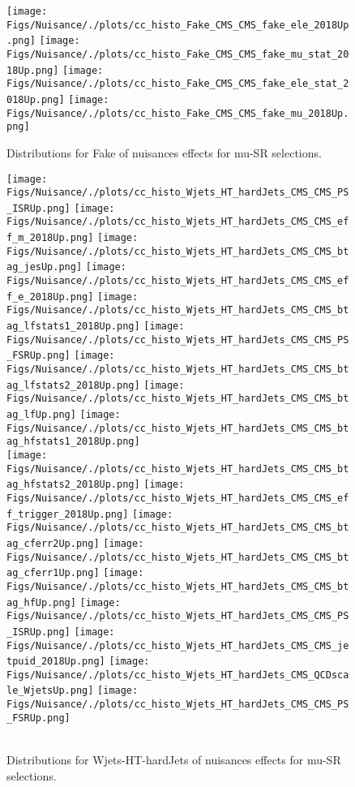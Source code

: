 \begin{figure*}[htbp]  
\centering 
\texttt{[image: Figs/Nuisance/./plots/cc\_histo\_Fake\_CMS\_CMS\_fake\_ele\_2018Up.png]}
\texttt{[image: Figs/Nuisance/./plots/cc\_histo\_Fake\_CMS\_CMS\_fake\_mu\_stat\_2018Up.png]}
\texttt{[image: Figs/Nuisance/./plots/cc\_histo\_Fake\_CMS\_CMS\_fake\_ele\_stat\_2018Up.png]}
\texttt{[image: Figs/Nuisance/./plots/cc\_histo\_Fake\_CMS\_CMS\_fake\_mu\_2018Up.png]}
\\ 
\caption{ 
   Distributions for Fake of nuisances effects for mu-SR selections.
} 
\label{fig:Fake_mu_SR} 
\end{figure*} 




\begin{figure*}[htbp]  
\centering 
\texttt{[image: Figs/Nuisance/./plots/cc\_histo\_Wjets\_HT\_hardJets\_CMS\_CMS\_PS\_ISRUp.png]}
\texttt{[image: Figs/Nuisance/./plots/cc\_histo\_Wjets\_HT\_hardJets\_CMS\_CMS\_eff\_m\_2018Up.png]}
\texttt{[image: Figs/Nuisance/./plots/cc\_histo\_Wjets\_HT\_hardJets\_CMS\_CMS\_btag\_jesUp.png]}
\texttt{[image: Figs/Nuisance/./plots/cc\_histo\_Wjets\_HT\_hardJets\_CMS\_CMS\_eff\_e\_2018Up.png]}
\texttt{[image: Figs/Nuisance/./plots/cc\_histo\_Wjets\_HT\_hardJets\_CMS\_CMS\_btag\_lfstats1\_2018Up.png]}
\texttt{[image: Figs/Nuisance/./plots/cc\_histo\_Wjets\_HT\_hardJets\_CMS\_CMS\_PS\_FSRUp.png]}
\texttt{[image: Figs/Nuisance/./plots/cc\_histo\_Wjets\_HT\_hardJets\_CMS\_CMS\_btag\_lfstats2\_2018Up.png]}
\texttt{[image: Figs/Nuisance/./plots/cc\_histo\_Wjets\_HT\_hardJets\_CMS\_CMS\_btag\_lfUp.png]}
\texttt{[image: Figs/Nuisance/./plots/cc\_histo\_Wjets\_HT\_hardJets\_CMS\_CMS\_btag\_hfstats1\_2018Up.png]}\\
\texttt{[image: Figs/Nuisance/./plots/cc\_histo\_Wjets\_HT\_hardJets\_CMS\_CMS\_btag\_hfstats2\_2018Up.png]}
\texttt{[image: Figs/Nuisance/./plots/cc\_histo\_Wjets\_HT\_hardJets\_CMS\_CMS\_eff\_trigger\_2018Up.png]}
\texttt{[image: Figs/Nuisance/./plots/cc\_histo\_Wjets\_HT\_hardJets\_CMS\_CMS\_btag\_cferr2Up.png]}
\texttt{[image: Figs/Nuisance/./plots/cc\_histo\_Wjets\_HT\_hardJets\_CMS\_CMS\_btag\_cferr1Up.png]}
\texttt{[image: Figs/Nuisance/./plots/cc\_histo\_Wjets\_HT\_hardJets\_CMS\_CMS\_btag\_hfUp.png]}
\texttt{[image: Figs/Nuisance/./plots/cc\_histo\_Wjets\_HT\_hardJets\_CMS\_CMS\_PS\_ISRUp.png]}
\texttt{[image: Figs/Nuisance/./plots/cc\_histo\_Wjets\_HT\_hardJets\_CMS\_CMS\_jetpuid\_2018Up.png]}
\texttt{[image: Figs/Nuisance/./plots/cc\_histo\_Wjets\_HT\_hardJets\_CMS\_QCDscale\_WjetsUp.png]}
\texttt{[image: Figs/Nuisance/./plots/cc\_histo\_Wjets\_HT\_hardJets\_CMS\_CMS\_PS\_FSRUp.png]}\\
\\ 
\caption{ 
   Distributions for Wjets-HT-hardJets of nuisances effects for mu-SR selections.
} 
\label{fig:Wjets_HT_hardJets_mu_SR} 
\end{figure*} 




